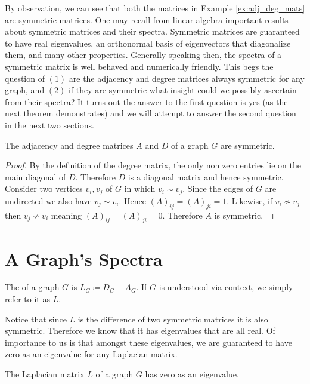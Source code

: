 \documentclass[11pt]{article}
\begin{document}
By observation, we can see that both the matrices in Example \ref{ex:adj_deg_mats} are symmetric matrices. One may recall from linear algebra important results about symmetric matrices and their spectra. Symmetric matrices are guaranteed to have real eigenvalues, an orthonormal basis of eigenvectors that diagonalize them, and many other properties. Generally speaking then, the spectra of a symmetric matrix is well behaved and numerically friendly. This begs the question of $(1)$ are the adjacency and degree matrices always symmetric for any graph, and $(2)$ if they are symmetric what insight could we possibly ascertain from their spectra? It turns out the answer to the first question is yes (as the next theorem demonstrates) and we will attempt to answer the second question in the next two sections.

\begin{theorem}
    \label{thm:adj_deg_symmetric}
    The adjacency and degree matrices $A$ and $D$ of a graph $G$ are symmetric.
\end{theorem}

\begin{proof}
    By the definition of the degree matrix, the only non zero entries lie on the main diagonal of $D$. Therefore $D$ is a diagonal matrix and hence symmetric. Consider two vertices $v_i, v_j$ of $G$ in which $v_i \sim v_j$. Since the edges of $G$ are undirected we also have $v_j \sim v_i$. Hence $(A)_{ij} = (A)_{ji} = 1$. Likewise, if $v_i \not\sim v_j$ then $v_j \not\sim v_i$ meaning $(A)_{ij} = (A)_{ji} = 0$. Therefore $A$ is symmetric.
\end{proof}

\section{A Graph's Spectra}

\begin{definition}
    The  of a graph $G$ is $L_G \coloneq D_G - A_G$. If $G$ is understood via context, we simply refer to it as $L$.
\end{definition}

Notice that since $L$ is the difference of two symmetric matrices it is also symmetric. Therefore we know that it has eigenvalues that are all real. Of importance to us is that amongst these eigenvalues, we are guaranteed to have zero as an eigenvalue for any Laplacian matrix.

\begin{theorem}
    \label{thm:lap_zero_eig_always}
    The Laplacian matrix $L$ of a graph $G$ has zero as an eigenvalue.
\end{theorem}
\end{document}
